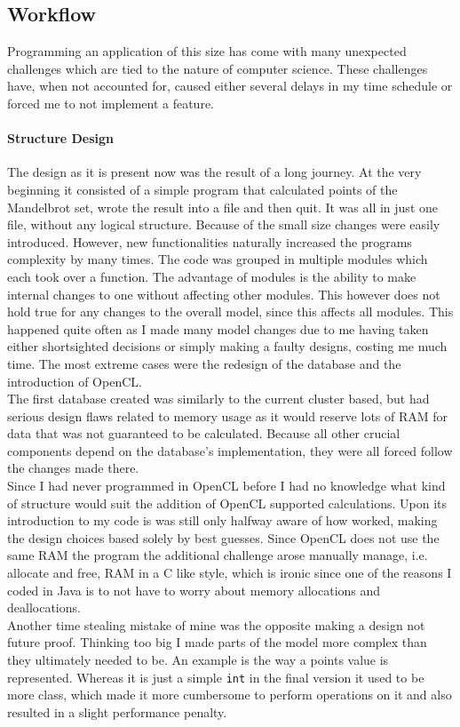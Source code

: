\documentclass[12pt,a4paper,titlepage]{article}
\begin{document}
	\subsection{Workflow}
	Programming an application of this size has come with many unexpected challenges which are tied to the nature of computer science. These challenges have, when not accounted for, caused either several delays in my time schedule or forced me to not implement a feature.
	\paragraph{Structure Design}
	The design as it is present now was the result of a long journey. At the very beginning it consisted of a simple program that calculated points of the Mandelbrot set, wrote the result into a file and then quit. It was all in just one file, without any logical structure. Because of the small size changes were easily introduced. However, new functionalities naturally increased the programs complexity by many times. The code was grouped in multiple modules which each took over a function. The advantage of modules is the ability to make internal changes to one without affecting other modules. This however does not hold true for any changes to the overall model, since this affects all modules. This happened quite often as I made many model changes due to me having taken either shortsighted decisions or simply making a faulty designs, costing me much time. The most extreme cases were the redesign of the database and the introduction of OpenCL.\\
	The first database created was similarly to the current cluster based, but had serious design flaws related to memory usage as it would reserve lots of RAM for data that was not guaranteed to be calculated. Because all other crucial components depend on the database's implementation, they were all forced follow the changes made there.\\
	Since I had never programmed in OpenCL before I had no knowledge what kind of structure would suit the addition of OpenCL supported calculations. Upon its introduction to my code is was still only halfway aware of how worked, making the design choices based solely by best guesses. Since OpenCL does not use the same RAM the program the additional challenge arose manually manage, i.e. allocate and free, RAM in a C like style, which is ironic since one of the reasons I coded in Java is to not have to worry about memory allocations and deallocations.\\
	Another time stealing mistake of mine was the opposite making a design not future proof. Thinking too big I made parts of the model more complex than they ultimately needed to be. An example is the way a points value is represented. Whereas it is just a simple \verb|int| in the final version it used to be more class, which made it more cumbersome to perform operations on it and also resulted in a slight performance penalty.
\end{document}
